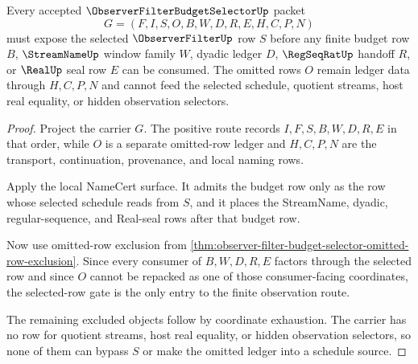\begin{theorem}
\label{thm:observer-filter-budget-selector-selected-row-gate}
Every accepted $\ObserverFilterBudgetSelectorUp$ packet
$$
G=(F,I,S,O,B,W,D,R,E,H,C,P,N)
$$
must expose the selected $\ObserverFilterUp$ row $S$ before any finite budget row $B$, $\StreamNameUp$ window family $W$, dyadic ledger $D$, $\RegSeqRatUp$ handoff $R$, or $\RealUp$ seal row $E$ can be consumed. The omitted rows $O$ remain ledger data through $H,C,P,N$ and cannot feed the selected schedule, quotient streams, host real equality, or hidden observation selectors.
\end{theorem}
\begin{proof}
Project the carrier $G$. The positive route records $I,F,S,B,W,D,R,E$ in that order, while $O$ is a separate omitted-row ledger and $H,C,P,N$ are the transport, continuation, provenance, and local naming rows.

Apply the local NameCert surface. It admits the budget row only as the row whose selected schedule reads from $S$, and it places the StreamName, dyadic, regular-sequence, and Real-seal rows after that budget row.

Now use omitted-row exclusion from \autoref{thm:observer-filter-budget-selector-omitted-row-exclusion}. Since every consumer of $B,W,D,R,E$ factors through the selected row and since $O$ cannot be repacked as one of those consumer-facing coordinates, the selected-row gate is the only entry to the finite observation route.

The remaining excluded objects follow by coordinate exhaustion. The carrier has no row for quotient streams, host real equality, or hidden observation selectors, so none of them can bypass $S$ or make the omitted ledger into a schedule source.
\end{proof}

